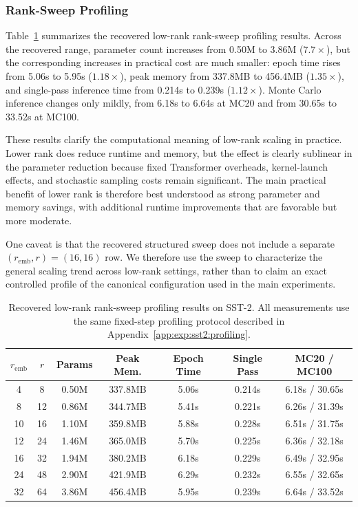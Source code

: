 \documentclass{article}
\theoremstyle{plain}
\theoremstyle{definition}
\theoremstyle{remark}
\begin{document}
\subsubsection{Rank-Sweep Profiling}
\label{app:ext:sst2:ranksweep}

Table~\ref{tab:sst2_rank_sweep} summarizes the recovered low-rank rank-sweep profiling results. Across the recovered range, parameter count increases from 0.50M to 3.86M ($7.7\times$), but the corresponding increases in practical cost are much smaller: epoch time rises from 5.06s to 5.95s ($1.18\times$), peak memory from 337.8MB to 456.4MB ($1.35\times$), and single-pass inference time from 0.214s to 0.239s ($1.12\times$). Monte Carlo inference changes only mildly, from 6.18s to 6.64s at MC20 and from 30.65s to 33.52s at MC100.

These results clarify the computational meaning of low-rank scaling in practice. Lower rank does reduce runtime and memory, but the effect is clearly sublinear in the parameter reduction because fixed Transformer overheads, kernel-launch effects, and stochastic sampling costs remain significant. The main practical benefit of lower rank is therefore best understood as strong parameter and memory savings, with additional runtime improvements that are favorable but more moderate.

One caveat is that the recovered structured sweep does not include a separate $(r_{\mathrm{emb}}, r)=(16,16)$ row. We therefore use the sweep to characterize the general scaling trend across low-rank settings, rather than to claim an exact controlled profile of the canonical configuration used in the main experiments.

\begin{table}[t]
\centering
\caption{Recovered low-rank rank-sweep profiling results on SST-2. All measurements use the same fixed-step profiling protocol described in Appendix~\ref{app:exp:sst2:profiling}.}
\label{tab:sst2_rank_sweep}
\small
{%
\begin{tabular}{ccccccc}
\toprule
\textbf{$r_{\mathrm{emb}}$} & \textbf{$r$} & \textbf{Params} & \textbf{Peak Mem.} & \textbf{Epoch Time} & \textbf{Single Pass} & \textbf{MC20 / MC100} \\
\midrule
4  & 8  & 0.50M & 337.8MB & 5.06s & 0.214s & 6.18s / 30.65s \\
8  & 12 & 0.86M & 344.7MB & 5.41s & 0.221s & 6.26s / 31.39s \\
10 & 16 & 1.10M & 359.8MB & 5.88s & 0.228s & 6.51s / 31.75s \\
12 & 24 & 1.46M & 365.0MB & 5.70s & 0.225s & 6.36s / 32.18s \\
16 & 32 & 1.94M & 380.2MB & 6.18s & 0.229s & 6.49s / 32.95s \\
24 & 48 & 2.90M & 421.9MB & 6.29s & 0.232s & 6.55s / 32.65s \\
32 & 64 & 3.86M & 456.4MB & 5.95s & 0.239s & 6.64s / 33.52s \\
\bottomrule
\end{tabular}%
}
\end{table}
\end{document}
